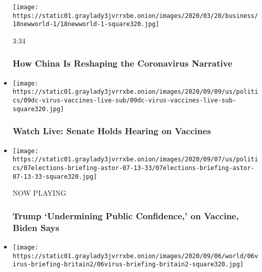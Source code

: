 \begin{itemize}
  \texttt{[image: https://static01.graylady3jvrrxbe.onion/images/2020/03/20/business/18newworld-1/18newworld-1-square320.jpg]}

  3:34

  \hypertarget{how-china-is-reshaping-the-coronavirus-narrative}{%
  \subsubsection{How China Is Reshaping the Coronavirus
  Narrative}\label{how-china-is-reshaping-the-coronavirus-narrative}}
\item
  \href{https://www.nytimes3xbfgragh.onion/video/us/politics/100000007331279/senate-vaccine-hearing.html?action=click\&module=video-series-bar\&region=header\&pgtype=Article\&playlistId=video/coronavirus-news-update}{}

  \texttt{[image: https://static01.graylady3jvrrxbe.onion/images/2020/09/09/us/politics/09dc-virus-vaccines-live-sub/09dc-virus-vaccines-live-sub-square320.jpg]}

  \hypertarget{watch-live-senate-holds-hearing-on-vaccines}{%
  \subsubsection{Watch Live: Senate Holds Hearing on
  Vaccines}\label{watch-live-senate-holds-hearing-on-vaccines}}
\item
  \texttt{[image: https://static01.graylady3jvrrxbe.onion/images/2020/09/07/us/politics/07elections-briefing-astor-07-13-33/07elections-briefing-astor-07-13-33-square320.jpg]}

  NOW PLAYING

  \hypertarget{trump-undermining-public-confidence-on-vaccine-biden-says-2}{%
  \subsubsection{Trump `Undermining Public Confidence,' on Vaccine,
  Biden
  Says}\label{trump-undermining-public-confidence-on-vaccine-biden-says-2}}
\item
  \href{https://www.nytimes3xbfgragh.onion/video/world/europe/100000007328066/britain-coronavirus-cases.html?action=click\&module=video-series-bar\&region=header\&pgtype=Article\&playlistId=video/coronavirus-news-update}{}

  \texttt{[image: https://static01.graylady3jvrrxbe.onion/images/2020/09/06/world/06virus-briefing-britain2/06virus-briefing-britain2-square320.jpg]}


\end{itemize}
